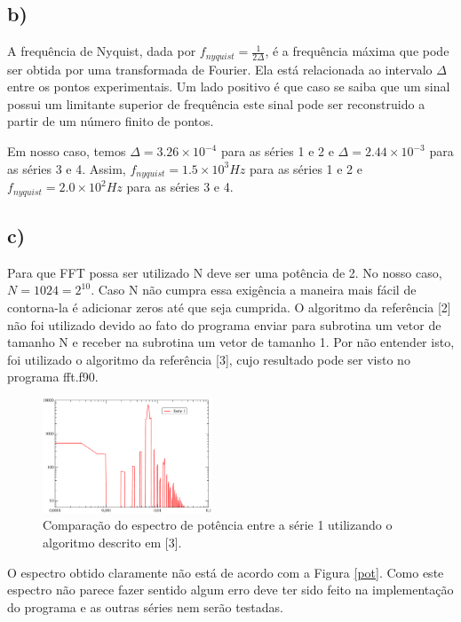 \documentclass[a4wide]{report}
\begin{document}
\subsection*{b)}
A frequência de Nyquist, dada por $f_{nyquist} = \frac{1}{2\Delta}$, é a frequência máxima que pode ser obtida por uma transformada de Fourier. Ela está relacionada ao intervalo $\Delta$ entre os pontos experimentais. Um lado positivo é que caso se saiba que um sinal possui um limitante superior de frequência este sinal pode ser reconstruido a partir de um número finito de pontos.

Em nosso caso, temos $\Delta = 3.26\times10^{-4}$ para as séries 1 e 2 e $\Delta = 2.44\times10^{-3}$ para as séries 3 e 4. Assim, $f_{nyquist} = 1.5 \times 10^{3} Hz$ para as séries 1 e 2 e $f_{nyquist} = 2.0 \times 10^{2}Hz$ para as séries 3 e 4.

\subsection*{c)}
Para que FFT possa ser utilizado N deve ser uma potência de 2. No nosso caso, $N = 1024 = 2^{10}$. Caso N não cumpra essa exigência a maneira mais fácil de contorna-la é adicionar zeros até que seja cumprida. O algoritmo da referência [2] não foi utilizado devido ao fato do programa enviar para subrotina um vetor de tamanho N e receber na subrotina um vetor de tamanho 1. Por não entender isto, foi utilizado o algoritmo da referência [3], cujo resultado pode ser visto no programa fft.f90. 

\begin{figure}[!htb]
\centering
\includegraphics[width=0.447\textwidth]{fft.pdf}
\caption{ Comparação do espectro de potência entre a série 1 utilizando o algoritmo descrito em [3].}
\label{3c}
\end{figure}

O espectro obtido claramente não está de acordo com a Figura \ref{pot}. Como este espectro não parece fazer sentido algum erro deve ter sido feito na implementação do programa e as outras séries nem serão testadas.
\end{document}
